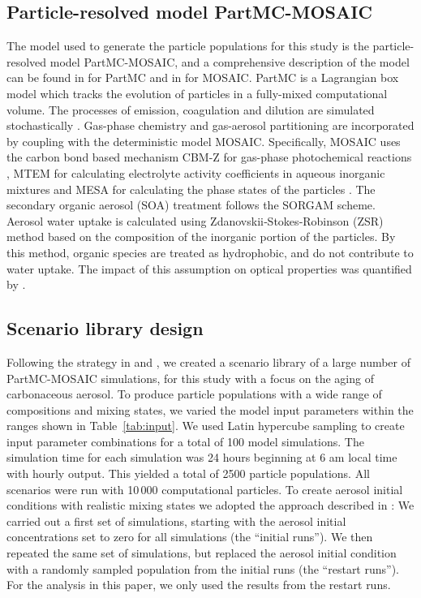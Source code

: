 \documentclass[edeposit,fullpage]{uiucthesis2009}
\begin{document}
\subsection{Particle-resolved model PartMC-MOSAIC}
The model used to generate the particle populations for this study is
the particle-resolved model PartMC-MOSAIC, and a comprehensive
description of the model can be found in \citet{Riemer2009} for PartMC
and in \citet{Zaveri2008} for MOSAIC. PartMC is a Lagrangian box model
which tracks the evolution of particles in a fully-mixed computational
volume. The processes of emission, coagulation and dilution are
simulated stochastically \citep{Zaveri2010a, ching2012impacts,
  tian2014modeling, Fierce2016, curtis2016accelerated,
  Ching2017}. Gas-phase chemistry and gas-aerosol partitioning are
incorporated by coupling with the deterministic model
MOSAIC. Specifically, MOSAIC uses the carbon bond based mechanism
CBM-Z for gas-phase photochemical reactions \citep{zaveri1999new},
MTEM for calculating electrolyte activity coefficients in aqueous
inorganic mixtures and MESA for calculating the phase states of the
particles \citep{zaveri2005computationally}. The secondary organic aerosol (SOA) treatment follows the SORGAM scheme. 
Aerosol water uptake is calculated using
Zdanovskii‐Stokes‐Robinson (ZSR) method \citep{Zaveri2008,
  zdanovskii1948new,stokes1966interactions} based on the composition
of the inorganic portion of the particles.  By this method, organic
species are treated as hydrophobic, and do not contribute to water
uptake. The impact of this assumption on optical properties was
quantified by \citet{nandy2021water}.

\subsection{Scenario library design}
Following the strategy in \citet{zheng2021estimating} and
\citet{hughes2018machine}, we created a scenario library of a large
number of PartMC-MOSAIC simulations, for this study with a focus on
the aging of carbonaceous aerosol. To produce particle populations
with a wide range of compositions and mixing states, we varied the
model input parameters within the ranges shown in
Table~\ref{tab:input}. We used Latin hypercube sampling
\citep{mckay2000comparison} to create input parameter combinations for
a total of 100 model simulations. The simulation time for each
simulation was 24 hours beginning at 6 am local time with hourly
output. This yielded a total of 2500 particle populations. All
scenarios were run with 10\,000 computational particles.  To create
aerosol initial conditions with realistic mixing states we adopted the
approach described in \citet{zheng2021estimating}: We carried out a first set of
simulations, starting with the aerosol initial concentrations set to
zero for all simulations (the ``initial runs''). We then repeated the
same set of simulations, but replaced the aerosol initial condition
with a randomly sampled population from the initial runs (the
``restart runs''). For the analysis in this paper, we only used the
results from the restart runs.
\end{document}
